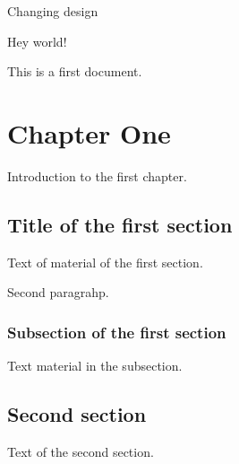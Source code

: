 \documentclass{book}
\begin{document}
Changing design

Hey world!

This is a first document.

\chapter{Chapter One}
Introduction to the first chapter.

\section{Title of the first section}
Text of material of the first section.

Second paragrahp.

\subsection{Subsection of the first section}
Text material in the subsection.


\section{Second section}
Text of the second section.
\end{document}
